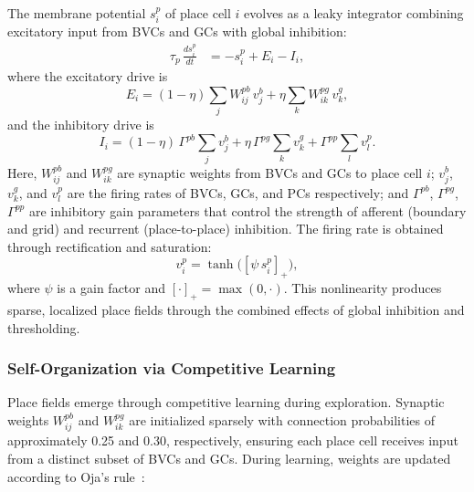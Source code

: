 \documentclass[conference]{IEEEtran}
\begin{document}
The membrane potential $s_i^p$ of place cell $i$ evolves as a leaky integrator combining excitatory input from BVCs and GCs with global inhibition:
\begin{align}
\tau_p \,\frac{ds_i^p}{dt}
&= -s_i^p + E_i - I_i,
\label{eq:state-dynamics}
\end{align}
where the excitatory drive is
\begin{equation}
E_i = (1-\eta)\sum_{j} W^{pb}_{ij}\,v^b_j + \eta \sum_{k} W^{pg}_{ik}\,v^g_k,
\end{equation}
and the inhibitory drive is
\begin{equation}
I_i = (1-\eta)\,\Gamma^{pb}\!\sum_{j} v^b_j + \eta\,\Gamma^{pg}\!\sum_{k} v^g_k + \Gamma^{pp}\!\sum_{l} v^p_l.
\end{equation}
Here, $W^{pb}_{ij}$ and $W^{pg}_{ik}$ are synaptic weights from BVCs and GCs to place cell $i$; $v^b_j$, $v^g_k$, and $v^p_l$ are the firing rates of BVCs, GCs, and PCs respectively; and $\Gamma^{pb}$, $\Gamma^{pg}$, $\Gamma^{pp}$ are inhibitory gain parameters that control the strength of afferent (boundary and grid) and recurrent (place-to-place) inhibition. The firing rate is obtained through rectification and saturation:
\begin{equation}
v_i^p = \tanh\!\big([\psi\,s_i^p]_+\big),
\label{eq:nonlinearity}
\end{equation}
where $\psi$ is a gain factor and $[\cdot]_+ = \max(0,\cdot)$. This nonlinearity produces sparse, localized place fields through the combined effects of global inhibition and thresholding.

\subsubsection{Self-Organization via Competitive Learning}

Place fields emerge through competitive learning during exploration. Synaptic weights $W^{pb}_{ij}$ and $W^{pg}_{ik}$ are initialized sparsely with connection probabilities of approximately 0.25 and 0.30, respectively, ensuring each place cell receives input from a distinct subset of BVCs and GCs. During learning, weights are updated according to Oja's rule~\cite{oja1982simplified,alabi2020oneshot,alabi2023}:
\end{document}

